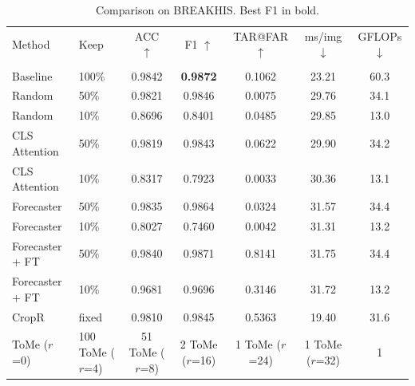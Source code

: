 \begin{table}[t]
\centering
\caption{Comparison on BREAKHIS. Best F1 in bold.}
\label{tab:comparison}
\begin{tabular}{llccccc}
\toprule
Method & Keep & ACC $\uparrow$ & F1 $\uparrow$ & TAR@FAR $\uparrow$ & ms/img $\downarrow$ & GFLOPs $\downarrow$ \\\\
\midrule
Baseline & 100\% & 0.9842 & \textbf{0.9872} & 0.1062 & 23.21 & 60.3 \\
Random & 50\% & 0.9821 & 0.9846 & 0.0075 & 29.76 & 34.1 \\
Random & 10\% & 0.8696 & 0.8401 & 0.0485 & 29.85 & 13.0 \\
CLS Attention & 50\% & 0.9819 & 0.9843 & 0.0622 & 29.90 & 34.2 \\
CLS Attention & 10\% & 0.8317 & 0.7923 & 0.0033 & 30.36 & 13.1 \\
Forecaster & 50\% & 0.9835 & 0.9864 & 0.0324 & 31.57 & 34.4 \\
Forecaster & 10\% & 0.8027 & 0.7460 & 0.0042 & 31.31 & 13.2 \\
Forecaster + FT & 50\% & 0.9840 & 0.9871 & 0.8141 & 31.75 & 34.4 \\
Forecaster + FT & 10\% & 0.9681 & 0.9696 & 0.3146 & 31.72 & 13.2 \\
CropR & fixed & 0.9810 & 0.9845 & 0.5363 & 19.40 & 31.6 \\
ToMe ($r$=0) & 100%
ToMe ($r$=4) & 51%
ToMe ($r$=8) & 2%
ToMe ($r$=16) & 1%
ToMe ($r$=24) & 1%
ToMe ($r$=32) & 1%
\bottomrule
\end{tabular}
\end{table}
